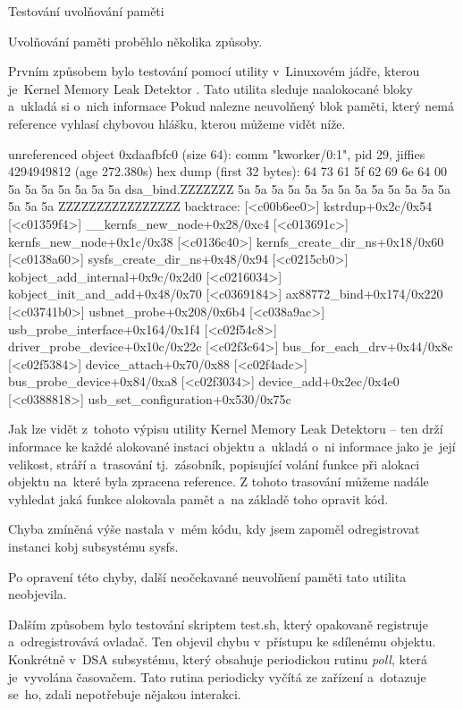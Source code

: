 \sec Testování uvolňování paměti

Uvolňování paměti proběhlo několika způsoby.

Prvním způsobem bylo testování pomocí utility v~Linuxovém jádře, kterou je~Kernel Memory Leak Detektor
.
Tato utilita sleduje naalokocané bloky a~ukladá si o~nich informace
Pokud nalezne neuvolňený blok paměti, který nemá reference vyhlasí chybovou hlášku, kterou můžeme vidět níže.

\begtt
unreferenced object 0xdaafbfc0 (size 64):
  comm "kworker/0:1", pid 29, jiffies 4294949812 (age 272.380s)
  hex dump (first 32 bytes):
    64 73 61 5f 62 69 6e 64 00 5a 5a 5a 5a 5a 5a 5a  dsa_bind.ZZZZZZZ
    5a 5a 5a 5a 5a 5a 5a 5a 5a 5a 5a 5a 5a 5a 5a 5a  ZZZZZZZZZZZZZZZZ
  backtrace:
    [<c00b6ee0>] kstrdup+0x2c/0x54
    [<c01359f4>] __kernfs_new_node+0x28/0xc4
    [<c013691c>] kernfs_new_node+0x1c/0x38
    [<c0136c40>] kernfs_create_dir_ns+0x18/0x60
    [<c0138a60>] sysfs_create_dir_ns+0x48/0x94
    [<c0215cb0>] kobject_add_internal+0x9c/0x2d0
    [<c0216034>] kobject_init_and_add+0x48/0x70
    [<c0369184>] ax88772_bind+0x174/0x220
    [<c03741b0>] usbnet_probe+0x208/0x6b4
    [<c038a9ac>] usb_probe_interface+0x164/0x1f4
    [<c02f54c8>] driver_probe_device+0x10c/0x22c
    [<c02f3c64>] bus_for_each_drv+0x44/0x8c
    [<c02f5384>] device_attach+0x70/0x88
    [<c02f4adc>] bus_probe_device+0x84/0xa8
    [<c02f3034>] device_add+0x2ec/0x4e0
    [<c0388818>] usb_set_configuration+0x530/0x75c
\endtt

Jak lze vidět z~tohoto výpisu utility Kernel Memory Leak Detektoru -- ten drží informace ke každé alokované instaci objektu a~ukladá o~ni informace jako je~její velikost, stráří a~trasování tj.~zásobník, popisující volání funkce při alokaci objektu na~které byla zpracena reference.
Z tohoto trasování můžeme nadále vyhledat jaká funkce alokovala pamět a~na základě toho opravit kód.

Chyba zmíněná výše nastala v~mém kódu, kdy jsem zapoměl odregistrovat instanci kobj subsystému sysfs.

Po opravení této chyby, další neočekavané neuvolňení paměti tato utilita neobjevila.

Dalším způsobem bylo testování skriptem test.sh, který opakovaně registruje a~odregistrovává ovladač.
Ten objevil chybu v~přístupu ke sdílenému objektu.
Konkrétně v~DSA subsystému, který obsahuje periodickou rutinu {\em poll}, která je~vyvolána časovačem.
Tato rutina periodicky vyčítá ze zařízení a~dotazuje se~ho, zdali nepotřebuje nějakou interakci.

